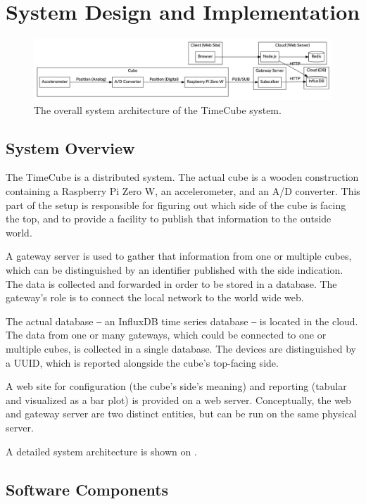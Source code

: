 \section{System Design and Implementation}

\begin{figure}[tbh]
    \centering
    \includegraphics[width=\linewidth]{architecture.png}
    \caption{The overall system architecture of the TimeCube system.}
    \label{fig:architecture}
\end{figure}

\subsection{System Overview}

The TimeCube is a distributed system. The actual cube is a wooden construction containing a Raspberry Pi Zero W, an accelerometer, and an A/D converter. This part of the setup is responsible for figuring out which side of the cube is facing the top, and to provide a facility to publish that information to the outside world.

A gateway server is used to gather that information from one or multiple cubes, which can be distinguished by an identifier published with the side indication. The data is collected and forwarded in order to be stored in a database. The gateway's role is to connect the local network to the world wide web.

The actual database ‒ an InfluxDB time series database ‒ is located in the cloud. The data from one or many gateways, which could be connected to one or multiple cubes, is collected in a single database. The devices are distinguished by a UUID, which is reported alongside the cube's top-facing side.

A web site for configuration (the cube's side's meaning) and reporting (tabular and visualized as a bar plot) is provided on a web server. Conceptually, the web and gateway server are two distinct entities, but can be run on the same physical server.

A detailed system architecture is shown on .

\subsection{Software Components}

